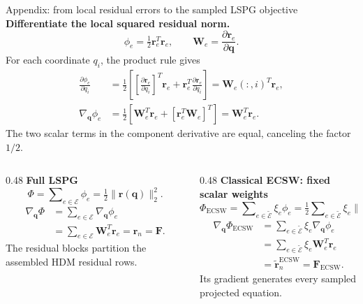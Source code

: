 \documentclass[aspectratio=169]{beamer}
\newcommand{\vect}[1]{\boldsymbol{#1}}
\newcommand{\matr}[1]{\boldsymbol{#1}}
\begin{document}
\begin{frame}{Appendix: from local residual errors to the sampled LSPG objective}
\hypertarget{bmecsw-lspg-objective-derivation}{}
\fontsize{8.5}{9.5}\selectfont
\setlength{\parskip}{0pt}
\setlength{\abovedisplayskip}{1pt}
\setlength{\belowdisplayskip}{1pt}
\setlength{\abovedisplayshortskip}{1pt}
\setlength{\belowdisplayshortskip}{1pt}
\textbf{Differentiate the local squared residual norm.}
\[
  \phi_e=\tfrac12\vect{r}_e^T\vect{r}_e,
  \qquad \matr{W}_e=\frac{\partial\vect{r}_e}{\partial\vect{q}}.
\]
For each coordinate $q_i$, the product rule gives
\[
\begin{aligned}
  \frac{\partial\phi_e}{\partial q_i}
  &=\tfrac12\left[
    \left[\frac{\partial\vect{r}_e}{\partial q_i}\right]^T\vect{r}_e
    +\vect{r}_e^T\frac{\partial\vect{r}_e}{\partial q_i}\right]
   =\matr{W}_e(:,i)^T\vect{r}_e,\\
  \nabla_{\vect{q}}\phi_e
  &=\tfrac12[\matr{W}_e^T\vect{r}_e+[\vect{r}_e^T\matr{W}_e]^T]
   =\matr{W}_e^T\vect{r}_e.
\end{aligned}
\]
The two scalar terms in the component derivative are equal, canceling the factor $1/2$.\par
\vspace{4pt}
\begin{columns}[T,onlytextwidth]
\begin{column}{0.48\textwidth}
\textbf{Full LSPG}
\[
  \Phi=\sum\nolimits_{e\in\mathcal E}\phi_e
  =\tfrac12\|\vect{r}(\vect{q})\|_2^2.
\]
\[
\begin{aligned}
  \nabla_{\vect{q}}\Phi
  &=\sum\nolimits_{e\in\mathcal E}\nabla_{\vect{q}}\phi_e\\
  &=\sum\nolimits_{e\in\mathcal E}\matr{W}_e^T\vect{r}_e
   =\vect{r}_n=\vect{F}.
\end{aligned}
\]
The residual blocks partition the assembled HDM residual rows.
\end{column}
\begin{column}{0.48\textwidth}
\textbf{Classical ECSW: fixed scalar weights}
\[
  \Phi_{\mathrm{ECSW}}
  =\sum\nolimits_{e\in\widetilde{\mathcal E}}\xi_e\phi_e
  =\tfrac12\sum\nolimits_{e\in\widetilde{\mathcal E}}\xi_e\|\vect{r}_e\|_2^2.
\]
\[
\begin{aligned}
  \nabla_{\vect{q}}\Phi_{\mathrm{ECSW}}
  &=\sum\nolimits_{e\in\widetilde{\mathcal E}}\xi_e\nabla_{\vect{q}}\phi_e\\
  &=\sum\nolimits_{e\in\widetilde{\mathcal E}}\xi_e\matr{W}_e^T\vect{r}_e\\
  &=\widetilde{\vect{r}}_n^{\mathrm{ECSW}}=\vect{F}_{\mathrm{ECSW}}.
\end{aligned}
\]
Its gradient generates every sampled projected equation.
\end{column}
\end{columns}
\vfill
\hfill\hyperlink{bmecsw-lspg-objective}{}
\end{frame}
\end{document}
